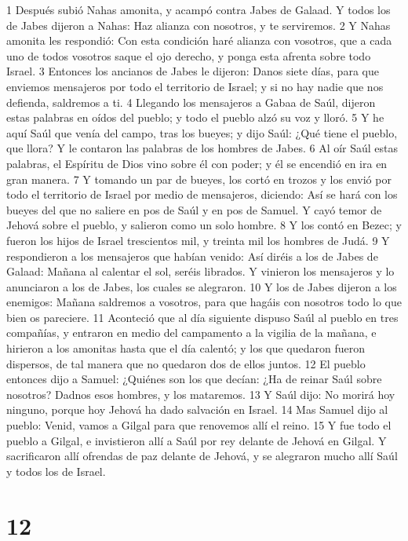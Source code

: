 1 Después subió Nahas amonita, y acampó contra Jabes de Galaad. Y todos los de Jabes dijeron a Nahas: Haz alianza con nosotros, y te serviremos.
2 Y Nahas amonita les respondió: Con esta condición haré alianza con vosotros, que a cada uno de todos vosotros saque el ojo derecho, y ponga esta afrenta sobre todo Israel.
3 Entonces los ancianos de Jabes le dijeron: Danos siete días, para que enviemos mensajeros por todo el territorio de Israel; y si no hay nadie que nos defienda, saldremos a ti.
4 Llegando los mensajeros a Gabaa de Saúl, dijeron estas palabras en oídos del pueblo; y todo el pueblo alzó su voz y lloró.
5 Y he aquí Saúl que venía del campo, tras los bueyes; y dijo Saúl: ¿Qué tiene el pueblo, que llora? Y le contaron las palabras de los hombres de Jabes.
6 Al oír Saúl estas palabras, el Espíritu de Dios vino sobre él con poder; y él se encendió en ira en gran manera.
7 Y tomando un par de bueyes, los cortó en trozos y los envió por todo el territorio de Israel por medio de mensajeros, diciendo: Así se hará con los bueyes del que no saliere en pos de Saúl y en pos de Samuel. Y cayó temor de Jehová sobre el pueblo, y salieron como un solo hombre.
8 Y los contó en Bezec; y fueron los hijos de Israel trescientos mil, y treinta mil los hombres de Judá.
9 Y respondieron a los mensajeros que habían venido: Así diréis a los de Jabes de Galaad: Mañana al calentar el sol, seréis librados. Y vinieron los mensajeros y lo anunciaron a los de Jabes, los cuales se alegraron.
10 Y los de Jabes dijeron a los enemigos: Mañana saldremos a vosotros, para que hagáis con nosotros todo lo que bien os pareciere.
11 Aconteció que al día siguiente dispuso Saúl al pueblo en tres compañías, y entraron en medio del campamento a la vigilia de la mañana, e hirieron a los amonitas hasta que el día calentó; y los que quedaron fueron dispersos, de tal manera que no quedaron dos de ellos juntos.
12 El pueblo entonces dijo a Samuel: ¿Quiénes son los que decían: ¿Ha de reinar Saúl sobre nosotros? Dadnos esos hombres, y los mataremos.
13 Y Saúl dijo: No morirá hoy ninguno, porque hoy Jehová ha dado salvación en Israel.
14 Mas Samuel dijo al pueblo: Venid, vamos a Gilgal para que renovemos allí el reino.
15 Y fue todo el pueblo a Gilgal, e invistieron allí a Saúl por rey delante de Jehová en Gilgal. Y sacrificaron allí ofrendas de paz delante de Jehová, y se alegraron mucho allí Saúl y todos los de Israel.

\chapter{12}

